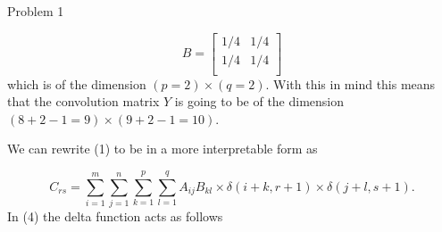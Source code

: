 \begin{problem}{Problem 1}
\begin{Highlight}[Solution]
        \begin{equation}
            B = 
            \begin{bmatrix}
                1/4 & 1/4 \\
                1/4 & 1/4 \\
            \end{bmatrix}
        \end{equation}
        which is of the dimension $(p = 2) \times (q = 2)$. With this in mind this means that the convolution matrix $Y$ is going to be of the dimension $(8 + 2 - 1 = 9) \times (9 + 2 - 1 = 10)$.

        We can rewrite (1) to be in a more interpretable form as 

        \begin{equation}
            C_{rs} = \sum_{i = 1}^{m}\sum_{j = 1}^{n}\sum_{k = 1}^{p}\sum_{l = 1}^{q} A_{ij}B_{kl} \times \delta(i + k, r + 1) \times \delta(j + l, s + 1).
        \end{equation}
        In (4) the delta function acts as follows


\end{Highlight}
\end{problem}
